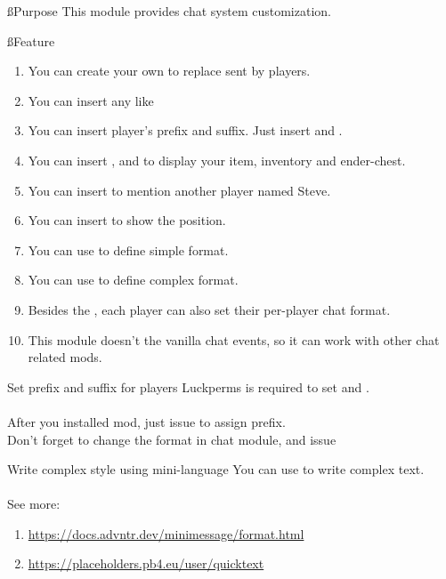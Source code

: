 \ss{Purpose}
This module provides chat system customization.

\ss{Feature}
\begin{enumerate}
    \item You can create your own  to replace  sent by players.
    \item You can insert any  like 
    \item {You can insert player's prefix and suffix. Just insert  and .}
    \item You can insert ,  and  to display your item, inventory and ender-chest.
    \item You can insert  to mention another player named Steve.
    \item You can insert  to show the position.
    \item You can use  to define simple format.
    \item You can use  to define complex format.
    \item Besides the , each player can also set their per-player chat format.
    \item This module doesn't  the vanilla chat events, so it can work with other chat related mods.
\end{enumerate}

\begin{note}{Set prefix and suffix for players}
    Luckperms is required to set  and .
    \\
    \\
    After you installed  mod, just issue  to assign prefix.
    \\
    Don't forget to change the format in chat module, and issue 
\end{note}

\begin{tips}{Write complex style using mini-language}
    You can use  to write complex text.
    \\
    \\
    See more:
    \begin{enumerate}
        \item \url{https://docs.advntr.dev/minimessage/format.html}
        \item \url{https://placeholders.pb4.eu/user/quicktext}
    \end{enumerate}
\end{tips}

